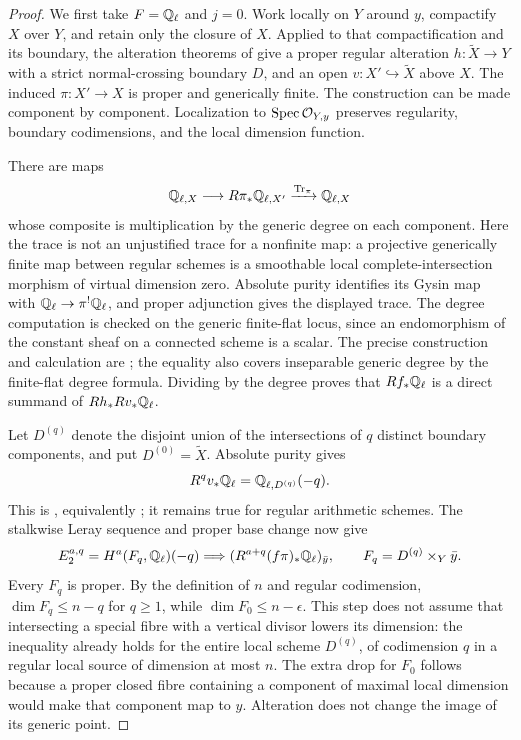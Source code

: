 \begin{proof}
We first take $F=\mathbb Q_\ell$ and $j=0$. Work locally on $Y$ around $y$, compactify $X$ over $Y$, and retain only the closure of $X$. Applied to that compactification and its boundary, the alteration theorems of \citet[Theorem 4.1 for varieties over fields; Theorem 8.2 for arithmetic schemes]{c_dejong1996} give a proper regular alteration $h:\widetilde X\to Y$ with a strict normal-crossing boundary $D$, and an open $v:X'\hookrightarrow\widetilde X$ above $X$. The induced $\pi:X'\to X$ is proper and generically finite. The construction can be made component by component. Localization to $\operatorname{Spec}\mathcal O_{Y,y}$ preserves regularity, boundary codimensions, and the local dimension function.

There are maps
\[
 \mathbb Q_{\ell,X}\longrightarrow R\pi_*\mathbb Q_{\ell,X'}
 \xrightarrow{\operatorname{Tr}_\pi}\mathbb Q_{\ell,X}
\]
whose composite is multiplication by the generic degree on each component. Here the trace is not an unjustified trace for a nonfinite map: a projective generically finite map between regular schemes is a smoothable local complete-intersection morphism of virtual dimension zero. Absolute purity identifies its Gysin map with $\mathbb Q_\ell\to\pi^!\mathbb Q_\ell$, and proper adjunction gives the displayed trace. The degree computation is checked on the generic finite-flat locus, since an endomorphism of the constant sheaf on a connected scheme is a scalar. The precise construction and calculation are \citet[Corollary 3.1.2, Lemmas 3.5.8--3.5.10, and Proposition 2.5.13]{c_riou2014}; the equality also covers inseparable generic degree by the finite-flat degree formula. Dividing by the degree proves that $Rf_*\mathbb Q_\ell$ is a direct summand of $Rh_*Rv_*\mathbb Q_\ell$.

Let $D^{(q)}$ denote the disjoint union of the intersections of $q$ distinct boundary components, and put $D^{(0)}=\widetilde X$. Absolute purity gives
\[
 R^qv_*\mathbb Q_\ell=\mathbb Q_{\ell,D^{(q)}}(-q).
\]
This is \citet[Corollary 3.1.4]{c_riou2014}, equivalently \citet[Theorem 2.1.2]{c_pillonistroh2014}; it remains true for regular arithmetic schemes. The stalkwise Leray sequence and proper base change now give
\[
 E_2^{a,q}=H^a(F_q,\mathbb Q_\ell)(-q)
 \Longrightarrow (R^{a+q}(f\pi)_*\mathbb Q_\ell)_{\bar y},
 \qquad F_q=D^{(q)}\times_Y\bar y.
\]
Every $F_q$ is proper. By the definition of $n$ and regular codimension, $\dim F_q\leq n-q$ for $q\geq1$, while $\dim F_0\leq n-\epsilon$. This step does not assume that intersecting a special fibre with a vertical divisor lowers its dimension: the inequality already holds for the entire local scheme $D^{(q)}$, of codimension $q$ in a regular local source of dimension at most $n$. The extra drop for $F_0$ follows because a proper closed fibre containing a component of maximal local dimension would make that component map to $y$. Alteration does not change the image of its generic point.


\end{proof}
